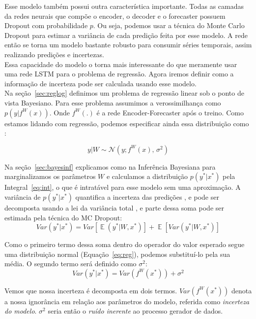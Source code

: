 Esse modelo também possui outra característica importante. Todas as camadas da
redes neurais que compõe o encoder, o decoder e o forecaster possuem
Dropout com probabilidade $p$. Ou seja, podemos usar a técnica do Monte
Carlo Dropout para estimar a variância de cada predição feita por esse modelo. A
rede então se torna um modelo bastante robusto para consumir séries temporais,
assim realizando predições e incertezas.\\


Essa capacidade do modelo o torna mais interessante do que meramente usar uma
rede LSTM para o problema de regressão. Agora iremos definir como a informação
de incerteza pode ser calculada usando esse modelo. \\

Na seção~\ref{sec:reglog} definimos um problema de regressão linear sob o ponto
de vista Bayesiano. Para esse problema assumimos a verossimilhança como $p(y |f^W(x))$.
Onde $f^W(.)$ é a rede Encoder-Forecaster após o treino.
Como estamos lidando com regressão, podemos especificar ainda essa distribuição
como \citep{ubertime}:  

\begin{equation}
  \label{eq:reg}
 y| W \sim \mathcal{N}(y;f^W(x),\,\sigma^2)
\end{equation}

 Na seção~\ref{sec:bayesinf} explicamos como na Inferência Bayesiana para marginalizamos os parâmetros $W$ e calculamos a distribuição $p(y^*
 | x^*)$ pela Integral~\ref{eq:int}, o que é intratável para esse modelo sem uma aproximação.
 A variância de $p(y^{*} | x^{*})$ quantifica a incerteza das predições
 \citep{dropbayes}, e pode ser decomposta usando a lei da variância total \citep{ubertime}, e parte dessa soma pode ser estimada pela técnica do MC Dropout: \\



\[ Var(y^* | x^*) = Var[\mathop{\mathbb{E}}(y^* | W,x^*)] +
  \mathop{\mathbb{E}}[Var(y^* | W,x^*)] \]

Como o primeiro termo dessa soma dentro do operador do valor esperado segue uma distribuição normal
(Equação~\ref{eq:reg}), podemos substituí-lo pela sua média. O
segundo termo será definido como $\sigma^2$: \\ 
 
\[ Var(y^* | x^*) = Var(f^W(x^*)) + \sigma^2 \] 


Vemos que nossa incerteza é decomposta em dois termos. $Var(f^W(x^*))$ denota a
nossa ignorância em relação aos parâmetros do modelo, referida como
\textit{incerteza do modelo}. $\sigma^2$ seria então o \textit{ruído inerente} ao
processo gerador de dados.
 
